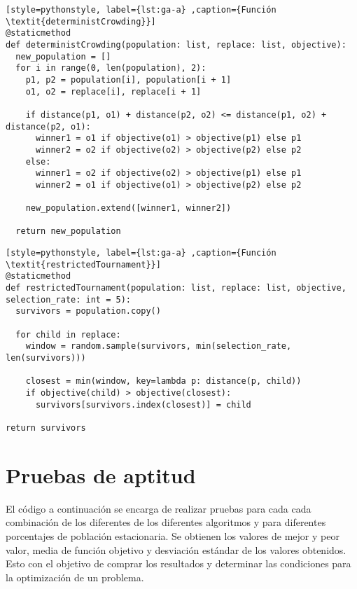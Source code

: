 \begin{lstlisting}[style=pythonstyle, label={lst:ga-a} ,caption={Función  \textit{deterministCrowding}}]
@staticmethod
def deterministCrowding(population: list, replace: list, objective):
  new_population = []
  for i in range(0, len(population), 2):
    p1, p2 = population[i], population[i + 1]
    o1, o2 = replace[i], replace[i + 1]

	if distance(p1, o1) + distance(p2, o2) <= distance(p1, o2) + distance(p2, o1):
	  winner1 = o1 if objective(o1) > objective(p1) else p1
	  winner2 = o2 if objective(o2) > objective(p2) else p2
	else:
	  winner1 = o2 if objective(o2) > objective(p1) else p1
	  winner2 = o1 if objective(o1) > objective(p2) else p2

  	new_population.extend([winner1, winner2])

  return new_population
\end{lstlisting}

\begin{lstlisting}[style=pythonstyle, label={lst:ga-a} ,caption={Función  \textit{restrictedTournament}}]
@staticmethod
def restrictedTournament(population: list, replace: list, objective, selection_rate: int = 5):
  survivors = population.copy()

  for child in replace:
	window = random.sample(survivors, min(selection_rate, len(survivors)))

	closest = min(window, key=lambda p: distance(p, child))
	if objective(child) > objective(closest):
	  survivors[survivors.index(closest)] = child

return survivors
\end{lstlisting}

\section{Pruebas de aptitud}

El código a continuación se encarga de realizar pruebas para cada cada combinación de los diferentes de los diferentes algoritmos y para diferentes porcentajes de población estacionaria. Se obtienen los valores de mejor y peor valor, media de función objetivo y desviación estándar de los valores obtenidos. Esto con el objetivo de comprar los resultados y determinar las condiciones para la optimización de un problema.

